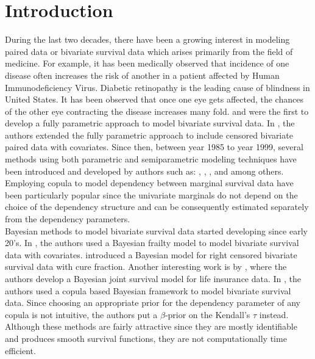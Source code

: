 \documentclass[11pt]{article}
\theoremstyle{remboldstyle}
\begin{document}
\section{Introduction}
\label{sec:intr}
\noindent
During the last two decades, there have been a growing interest in modeling paired data or bivariate survival data which arises primarily from the field of medicine. For example, it has been medically observed that incidence of one disease often increases the risk of another in a patient affected by Human Immunodeficiency Virus. Diabetic retinopathy is the leading cause of blindness in United States. It has been observed that once one eye gets affected, the chances of the other eye contracting the disease increases many fold. \cite{clayton:1978} and \cite{oakes:1982} were the first to develop a fully parametric approach to model bivariate survival data. In \cite{huster:brookmeyer:self:1989}, the authors extended the fully parametric approach to include censored bivariate paired data with covariates. Since then, between year 1985 to year 1999, several methods using both parametric and semiparametric modeling techniques have been introduced and developed by authors such as: \cite{nelson:1986}, \cite{oakes:1986}, \cite{shih:louis:1995}, \cite{genest:1993} and \cite{wang:wells:2000} among others. Employing copula to model dependency between marginal survival data have been particularly popular since the univariate marginals do not depend on the choice of the dependency structure and can be consequently estimated separately from the dependency parameters.\\
Bayesian methods to model bivariate survival data started developing since early 20's. In \cite{sahu:dey:2000}, the authors used a Bayesian frailty model to model bivariate survival data with covariates. \cite{chen:ibra:sinh:2002} introduced a Bayesian model for right censored bivariate survival data with cure fraction. Another interesting work is by \cite{shem:youn:2000}, where the authors develop a Bayesian joint survival model for life insurance data. In \cite{romeo:tanaka:2006}, the authors used a copula based Bayesian framework to model bivariate survival data. Since choosing an appropriate prior for the dependency parameter of any copula is not intuitive, the authors put a $\beta$-prior on the Kendall's $\tau$ instead. Although these methods are fairly attractive since they are mostly identifiable and produces smooth survival functions, they are not computationally time efficient.
\end{document}
